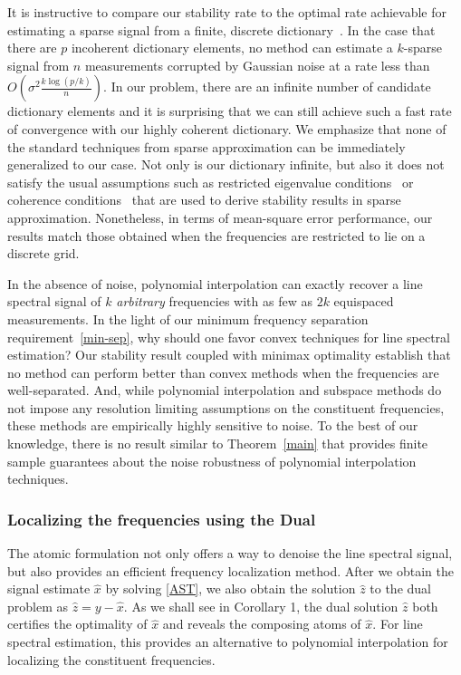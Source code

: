 It is instructive to compare our stability rate to the optimal rate achievable for estimating a sparse signal from a finite, discrete dictionary~\cite{cd_minimax}. In the case that there are $p$ incoherent  dictionary elements,  no method can estimate a $k$-sparse signal from $n$ measurements corrupted by Gaussian noise at a rate less than $O(\sigma^2 \frac{k\log(p/k)}{n})$.  In our problem, there are an infinite number of candidate dictionary elements and it is surprising that we can still achieve such a fast rate of convergence with our highly coherent dictionary.  We emphasize that none of the standard techniques from sparse approximation can be immediately generalized to our case.  Not only is our dictionary infinite, but also it does not satisfy the usual assumptions such as restricted eigenvalue conditions~\cite{rest_eig} or coherence conditions~\cite{coherence} that are used to derive stability results in sparse approximation.  Nonetheless, in terms of mean-square error performance, our results match those obtained when the frequencies are restricted to lie on a discrete grid.

In the absence of noise, polynomial interpolation can exactly recover a line spectral signal of $k$ \emph{arbitrary} frequencies with as few as $2 k$ equispaced measurements.   In the light of our minimum frequency separation requirement~\eqref{min-sep}, why should one favor convex techniques for line spectral estimation? Our stability result coupled with minimax optimality establish that no method can perform better than convex methods when the frequencies are well-separated.  And, while polynomial interpolation and subspace methods do not impose any resolution limiting assumptions on the constituent frequencies, these methods are empirically highly sensitive to noise. To the best of our knowledge, there is no result similar to Theorem~\ref{main} that provides finite sample guarantees about the noise robustness of polynomial interpolation techniques.  


\subsubsection{Localizing the frequencies using the Dual} 

The atomic formulation not only offers a way to denoise the line spectral
signal, but also provides an efficient frequency localization method. After we
obtain the signal estimate $\hat{x}$ by solving \eqref{AST}, we also obtain the
solution $\hat{z}$ to the dual problem as $\hat{z} = y - \hat{x}$. As we shall
see in Corollary 1, the dual solution $\hat{z}$ both certifies the optimality of
$\hat{x}$ and reveals the composing atoms of $\hat{x}$. For line spectral
estimation, this provides an alternative to polynomial interpolation for
localizing the constituent frequencies.


